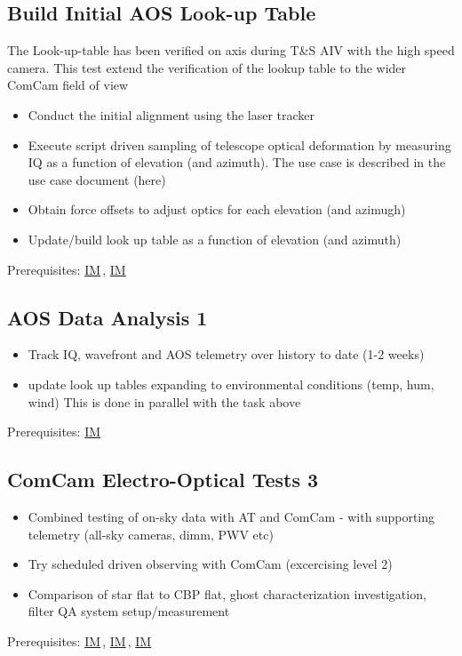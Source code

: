 \documentclass[SE,authoryear,toc]{lsstdoc}
\newcommand{\IM}[1]{\hyperref[IM:#1]{\color{blue}IM$_{\text{\csname nameIM#1\endcsname}}$}\gdef\thisIM{#1}}
\begin{document}
\subsection{Build Initial AOS Look-up Table}

The Look-up-table has been verified on axis during T\&S AIV with the high speed camera. This test extend the verification of the lookup table to the wider ComCam field of view

\begin{itemize}
\item Conduct the initial alignment using the laser tracker
\item Execute script driven sampling of telescope optical deformation by measuring IQ as a function of elevation (and azimuth). The use case is described in the use case document (here)
\item Obtain force offsets to adjust optics for each elevation (and azimugh)
\item Update/build look up table as a function of elevation (and azimuth)
\end{itemize}
Prerequisites: \IM{b}, \IM{g}

\subsection{AOS Data Analysis 1}

\begin{itemize}
\item Track IQ, wavefront and AOS telemetry over history to date (1-2 weeks)
\item update look up tables expanding to environmental conditions (temp, hum, wind)
  This is done in parallel with the task above
\end{itemize}
Prerequisites: \IM{b}

\subsection{ComCam Electro-Optical Tests 3}

\begin{itemize}
\item Combined testing of on-sky data with AT and ComCam - with supporting telemetry (all-sky cameras, dimm, PWV etc)
\item Try scheduled driven observing with ComCam (excercising level 2)
\item Comparison of star flat to CBP flat, ghost characterization investigation, filter QA system setup/measurement
\end{itemize}
Prerequisites: \IM{b}, \IM{g}, \IM{cbp}
\end{document}
